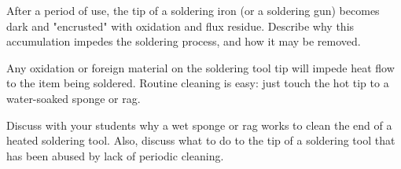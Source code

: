 

After a period of use, the tip of a soldering iron (or a soldering gun) becomes dark and "encrusted" with oxidation and flux residue.  Describe why this accumulation impedes the soldering process, and how it may be removed.







Any oxidation or foreign material on the soldering tool tip will impede heat flow to the item being soldered.  Routine cleaning is easy: just touch the hot tip to a water-soaked sponge or rag.







Discuss with your students why a wet sponge or rag works to clean the end of a heated soldering tool.  Also, discuss what to do to the tip of a soldering tool that has been abused by lack of periodic cleaning.





